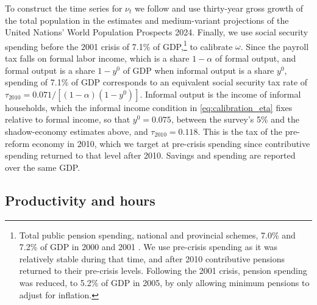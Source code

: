 To construct the time series for $\nu_t$ we follow \textcite{mkvss08} and use thirty-year gross growth of the total population in the estimates and medium-variant projections of the United Nations' World Population Prospects 2024. Finally, we use social security spending before the 2001 crisis of 7.1\% of GDP,\footnote{Total public pension spending, national and provincial schemes, 7.0\% and 7.2\% of GDP in 2000 and 2001 \parencite[table 13]{CetrangoloG}. We use pre-crisis spending as it was relatively stable during that time, and after 2010 contributive pensions returned to their pre-crisis levels. Following the 2001 crisis, pension spending was reduced, to 5.2\% of GDP in 2005, by only allowing minimum pensions to adjust for inflation.} to calibrate $\omega$. Since the payroll tax falls on formal labor income, which is a share $1-\alpha$ of formal output, and formal output is a share $1-y^0$ of GDP when informal output is a share $y^0$, spending of 7.1\% of GDP corresponds to an equivalent social security tax rate of $\tau_{2010} = 0.071/[(1-\alpha)(1-y^0)]$. Informal output is the income of informal households, which the informal income condition in \eqref{eq:calibration_eta} fixes relative to formal income, so that $y^0 = 0.075$, between the survey's 5\% and the shadow-economy estimates above, and $\tau_{2010} = 0.118$. This is the tax of the pre-reform economy in 2010, which we target at pre-crisis spending since contributive spending returned to that level after 2010. Savings and spending are reported over the same GDP.

\subsection{Productivity and hours}

